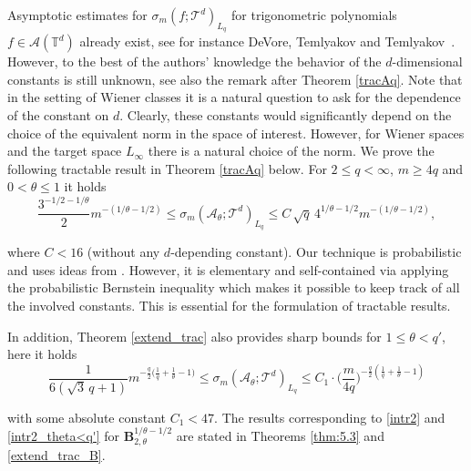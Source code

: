 \documentclass[11pt,reqno]{article}
\numberwithin{equation}{section}
\theoremstyle{definition}
\theoremstyle{plain}
\newcommand{\tor}{\ensuremath{\mathbb{T}}}
\newcommand{\ca}{\ensuremath{\mathcal A}}
\begin{document}
Asymptotic estimates for $\sigma_m(f;\mathcal{T}^d)_{L_q}$ for trigonometric polynomials $f \in \mathcal{A}(\tor^d)$ already exist, see for instance DeVore, Temlyakov \cite{DeTe95} and Temlyakov \cite{Tem15,Teml_CA_2017}\,. However, to the best of the authors' knowledge the behavior of the $d$-dimensional constants is still unknown, see also the remark after Theorem  \ref{tracAq}. Note that in the setting of Wiener classes it is a natural question to ask for the dependence of the constant on $d$. Clearly, these constants would significantly depend on the choice of the equivalent norm in the space of interest. However, for Wiener spaces and the target space $L_\infty$ there is a natural choice of the norm. We prove the following tractable result in Theorem \ref{tracAq} below. For \(2 \leq q < \infty\), \(m \geq 4q\) and \(0 <\theta \leq 1\) it holds
\begin{equation}\label{intr2}
\frac{3^{-1/2-1/\theta}}{2} m^{-(1/\theta-1/2)} \leq  \sigma_{m}(\mathcal{A}_\theta;\mathcal{T}^d)_{L_q} \leq 
  C\, \sqrt{q}\,4^{1/\theta-1/2} m^{-(1/\theta-1/2)}
,
\end{equation}

 \noindent 
 where $C <  16$ (without any $d$-depending constant). Our technique is probabilistic and uses ideas from \cite{Mak84}. However, it is elementary and self-contained via applying the probabilistic Bernstein inequality which makes it possible to keep track of all the involved constants. 
 This is essential for the formulation of tractable results. 


 In addition, Theorem \ref{extend_trac} also provides sharp bounds for \(1 \leq \theta < q'\), here it holds
  \begin{equation}\label{intr2_theta<q'}
 \frac{1}{ 6 (\sqrt{3}\, q + 1) } m^{ -\frac{q}{2}\big(\frac{1}{q}+\frac{1}{\theta}-1\big)} \leq \sigma_{m}(\ca_\theta;\mathcal{T}^d)_{L_q} \leq 
       C_1 \cdot \Big(\frac{m}{4q}\Big)^{-\frac{q}{2}\left(\frac{1}{q}+\frac{1}{\theta}-1\right)}  
  \end{equation} 
  
 \noindent  
 with some absolute constant \(C_1  < 47 \).
The results corresponding to \eqref{intr2} and \eqref{intr2_theta<q'} for $\mathbf{B}^{1/\theta-1/2}_{2,\theta}$ are stated in Theorems \ref{thm:5.3} and \ref{extend_trac_B}.

 \medskip
 
\end{document}
